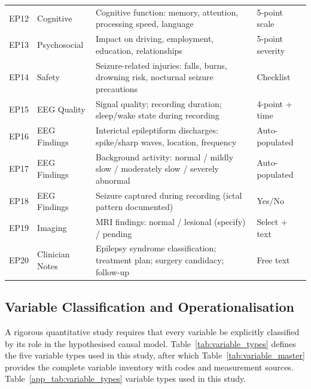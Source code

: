 {\begin{xltabular}{\textwidth}{@{} >{\raggedright\arraybackslash}p{0.5cm} >{\raggedright\arraybackslash}p{2.0cm} L p{1.4cm} @{}}
\addlinespace
EP12 & Cognitive & Cognitive function: memory, attention, processing speed, language & 5-point scale \\
\addlinespace
EP13 & Psychosocial & Impact on driving, employment, education, relationships & 5-point severity \\
\addlinespace
EP14 & Safety & Seizure-related injuries: falls, burns, drowning risk, nocturnal seizure precautions & Checklist \\
\addlinespace
EP15 & EEG Quality & Signal quality; recording duration; sleep/wake state during recording & 4-point + time \\
\addlinespace
EP16 & EEG Findings & Interictal epileptiform discharges: spike/sharp waves, location, frequency & Auto-populated \\
\addlinespace
EP17 & EEG Findings & Background activity: normal / mildly slow / moderately slow / severely abnormal & Auto-populated \\
\addlinespace
EP18 & EEG Findings & Seizure captured during recording (ictal pattern documented) & Yes/No \\
\addlinespace
EP19 & Imaging & MRI findings: normal / lesional (specify) / pending & Select + text \\
\addlinespace
EP20 & Clinician Notes & Epilepsy syndrome classification; treatment plan; surgery candidacy; follow-up & Free text \\
\end{xltabular}}


\subsection{Variable Classification and Operationalisation}
\label{app_sec:variable_classification}

A rigorous quantitative study requires that every variable be explicitly classified by its role in the hypothesised causal model. Table~\ref{tab:variable_types} defines the five variable types used in this study, after which Table~\ref{tab:variable_master} provides the complete variable inventory with codes and measurement sources.
\noindent Table~\ref{app_tab:variable_types} variable types used in this study.

